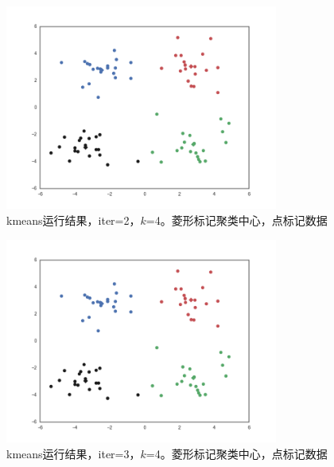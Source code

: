 \documentclass{ctexart}
\begin{document}
\begin{figure}[H]
\begin{center}
\includegraphics[width=0.8\textwidth]{fig/iter-02.png} %
\caption{kmeans运行结果，iter=2，$k$=4。菱形标记聚类中心，点标记数据}
\end{center}
\end{figure}


\begin{figure}[H]
\begin{center}
\includegraphics[width=0.8\textwidth]{fig/iter-03.png} %
\caption{kmeans运行结果，iter=3，$k$=4。菱形标记聚类中心，点标记数据}
\end{center}
\end{figure}
\end{document}
